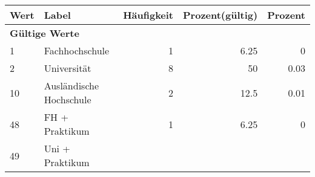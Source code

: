      \begin{longtable}{lXrrr}
     \toprule
     \textbf{Wert} & \textbf{Label} & \textbf{Häufigkeit} & \textbf{Prozent(gültig)} & \textbf{Prozent} \\
     \endhead
     \midrule
     \multicolumn{5}{l}{\textbf{Gültige Werte}}\\

     1 &
     \multicolumn{1}{X}{ Fachhochschule   } &


       \num{1} &
       \num[round-mode=places,round-precision=2]{6,25} &
         \num[round-mode=places,round-precision=2]{0} \\

     2 &
     \multicolumn{1}{X}{ Universität   } &


       \num{8} &
       \num[round-mode=places,round-precision=2]{50} &
         \num[round-mode=places,round-precision=2]{0,03} \\

     10 &
     \multicolumn{1}{X}{ Ausländische Hochschule   } &


       \num{2} &
       \num[round-mode=places,round-precision=2]{12,5} &
         \num[round-mode=places,round-precision=2]{0,01} \\

     48 &
     \multicolumn{1}{X}{ FH + Praktikum   } &


       \num{1} &
       \num[round-mode=places,round-precision=2]{6,25} &
         \num[round-mode=places,round-precision=2]{0} \\

     49 &
     \multicolumn{1}{X}{ Uni + Praktikum   } &



\end{longtable}
